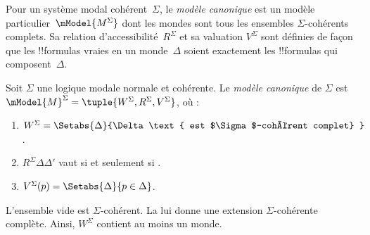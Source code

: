 \documentclass[../../../include/open-logic-section]{subfiles}
\begin{document}


Pour un système modal cohérent~$\Sigma$, le \emph{modèle canonique} est un modèle
particulier~$\mModel{M^\Sigma}$ dont les mondes sont tous les
ensembles $\Sigma$-cohérents complets. Sa relation
d'accessibilité~$R^\Sigma$ et sa valuation $V^\Sigma$ sont définies de
façon que les !!{formula}s vraies en un monde~$\Delta$ soient
exactement les !!{formula}s qui composent~$\Delta$.

\begin{defn}
  Soit $\Sigma$ une logique modale normale et cohérente. Le \emph{modèle canonique}
  de $\Sigma$ est $\mModel{M}^\Sigma = \tuple{W^\Sigma, R^\Sigma,
    V^\Sigma}$, où :
  \begin{enumerate}
  \item $W^\Sigma = \Setabs{ \Delta }{\Delta \text{
      est $\Sigma$-cohérent complet} }$.
  \item $R^\Sigma \Delta\Delta'$ vaut si et seulement si
    .
  \item $V^\Sigma(p) = \Setabs{\Delta}{p \in \Delta}$.
  \end{enumerate}
\end{defn}

L'ensemble vide est $\Sigma$-cohérent. La
 lui donne une extension $\Sigma$-cohérente
complète. Ainsi, $W^\Sigma$ contient au moins un monde.
\end{document}
